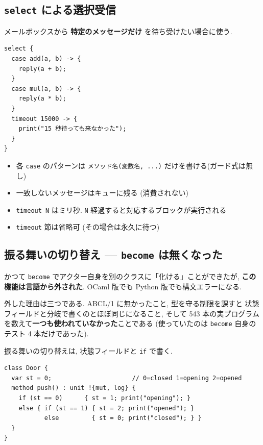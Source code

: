 \documentclass[11pt,a4paper]{article}
\begin{document}
\subsection{\texttt{select} による選択受信}

メールボックスから \textbf{特定のメッセージだけ} を待ち受けたい場合に使う.

\begin{lstlisting}
select {
  case add(a, b) -> {
    reply(a + b);
  }
  case mul(a, b) -> {
    reply(a * b);
  }
  timeout 15000 -> {
    print("15 秒待っても来なかった");
  }
}
\end{lstlisting}

\begin{itemize}
  \item 各 \texttt{case} のパターンは \texttt{メソッド名(変数名, ...)} だけを書ける(ガード式は無し)
  \item 一致しないメッセージはキューに残る (消費されない)
  \item \texttt{timeout N} はミリ秒. \texttt{N} 経過すると対応するブロックが実行される
  \item \texttt{timeout} 節は省略可 (その場合は永久に待つ)
\end{itemize}

\subsection{振る舞いの切り替え --- \texttt{become} は無くなった}

かつて \texttt{become} でアクター自身を別のクラスに「化ける」ことができたが,
\textbf{この機能は言語から外された}. OCaml 版でも Python 版でも構文エラーになる.

外した理由は三つである. ABCL/1 に無かったこと, 型を守る制限を課すと
状態フィールドと分岐で書くのとほぼ同じになること, そして
543 本の実プログラムを数えて\textbf{一つも使われていなかった}ことである
(使っていたのは \texttt{become} 自身のテスト 4 本だけであった).

振る舞いの切り替えは, 状態フィールドと \texttt{if} で書く.

\begin{lstlisting}
class Door {
  var st = 0;                      // 0=closed 1=opening 2=opened
  method push() : unit !{mut, log} {
    if (st == 0)      { st = 1; print("opening"); }
    else { if (st == 1) { st = 2; print("opened"); }
           else         { st = 0; print("closed"); } }
  }
}
\end{lstlisting}
\end{document}
